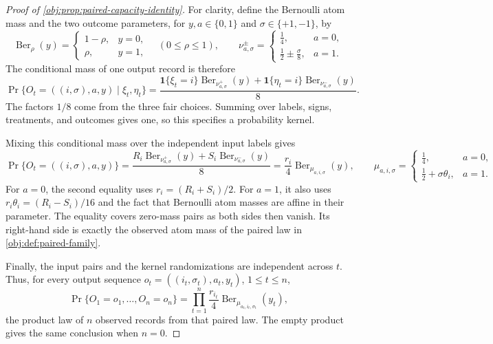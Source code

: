 \documentclass[11pt]{article}
\begin{document}
\begin{proof}[Proof of \cref{obj:prop:paired-capacity-identity}]
For clarity, define the Bernoulli atom mass and the two outcome parameters, for \(y,a\in\{0,1\}\) and \(\sigma\in\{+1,-1\}\), by
\[
\operatorname{Ber}_{\rho}(y)
=\begin{cases}1-\rho,&y=0,\\ \rho,&y=1,\end{cases}
\quad(0\leq\rho\leq1),
\qquad
\nu^\pm_{a,\sigma}
=\begin{cases}\frac14,&a=0,\\[2pt]\frac12\pm\frac{\sigma}{8},&a=1.\end{cases}
\]
The conditional mass of one output record is therefore
\[
\Pr\{O_t=((i,\sigma),a,y)\mid \xi_t,\eta_t\}
=\frac{
 \mathbf1\{\xi_t=i\}\operatorname{Ber}_{\nu^+_{a,\sigma}}(y)
+\mathbf1\{\eta_t=i\}\operatorname{Ber}_{\nu^-_{a,\sigma}}(y)
}{8}.
\] %
The factors \(1/8\) come from the three fair choices. Summing over labels, signs, treatments, and outcomes gives one, so this specifies a probability kernel.

Mixing this conditional mass over the independent input labels gives
\[
\Pr\{O_t=((i,\sigma),a,y)\}
=\frac{
 R_i\operatorname{Ber}_{\nu^+_{a,\sigma}}(y)
+S_i\operatorname{Ber}_{\nu^-_{a,\sigma}}(y)
}{8}
=\frac{r_i}{4}\operatorname{Ber}_{\mu_{a,i,\sigma}}(y),
\qquad
\mu_{a,i,\sigma}
=\begin{cases}\frac14,&a=0,\\[2pt]\frac12+\sigma\theta_i,&a=1.\end{cases}
\] %
For \(a=0\), the second equality uses \(r_i=(R_i+S_i)/2\). For \(a=1\), it also uses \(r_i\theta_i=(R_i-S_i)/16\) and the fact that Bernoulli atom masses are affine in their parameter. The equality covers zero-mass pairs as both sides then vanish. Its right-hand side is exactly the observed atom mass of the paired law in \cref{obj:def:paired-family}.

Finally, the input pairs and the kernel randomizations are independent across \(t\). Thus, for every output sequence \(o_t=((i_t,\sigma_t),a_t,y_t)\), \(1\leq t\leq n\),
\[
\Pr\{O_1=o_1,\ldots,O_n=o_n\}
=\prod_{t=1}^n
 \frac{r_{i_t}}4\operatorname{Ber}_{\mu_{a_t,i_t,\sigma_t}}(y_t),
\]
the product law of \(n\) observed records from that paired law. The empty product gives the same conclusion when \(n=0\). %
\end{proof}




\end{document}
